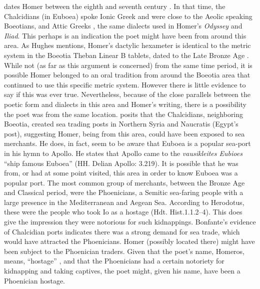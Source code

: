 \textcite[49]{Morford2011} dates Homer between the eighth and seventh century \BC. In that time, the Chalcidians (in Euboea) spoke Ionic Greek and were close to the Aeolic speaking Boeotians, and Attic Greeks \parencite[51]{Woodard2008}, the same dialects used in Homer’s \emph{Odyssey} and \emph{Iliad}.  This perhaps is an indication the poet might have been from around this area. As Hughes mentions, Homer’s dactylic hexameter is identical to the metric system in the Boeotia Theban Linear B tablets, dated to the Late Bronze Age \parencite[198]{Hughes2013}. While not (as far as this argument is concerned) from the same time period, it is possible Homer belonged to an oral tradition from around the Boeotia area that continued to use this specific metric system. However there is little evidence to say if this was ever true. Nevertheless, because of the close parallels between the poetic form and dialects in this area and Homer’s writing, there is a possibility the poet was from the same location. \textcite[69]{Bonfante1986} posits that the Chalcidians, neighboring Boeotia, created sea trading posts in Northern Syria and Naucratis (Egypt’s post), suggesting Homer, being from this area, could have been exposed to sea merchants. He does, in fact, seem to be aware that Euboea is a popular sea-port in his hymn to Apollo. He states that Apollo came to the \emph{vausikleites Eubioes} “ship famous Euboea” (HH. Delian Apollo: 3.219). It is possible that he was from, or had at some point visited, this area in order to know Euboea was a popular port. The most common group of merchants, between the Bronze Age and Classical period, were the Phoenicians, a Semitic sea-faring people with a large presence in the Mediterranean and Aegean Sea.  According to Herodotus, these were the people who took Io as a hostage (Hdt. Hist.1.1.2–4). This does give the impression they were notorious for such kidnappings. Bonfante’s evidence of Chalcidian ports indicates there was a strong demand for sea trade, which would have attracted the Phoenicians. Homer (possibly located there) might have been subject to the Phoenician traders. Given that the poet’s name, Homeros, means, “hostage” \parencite{Liddell1940}, and that the Phoenicians had a certain notoriety for kidnapping and taking captives, the poet might, given his name, have been a Phoenician hostage.
	
